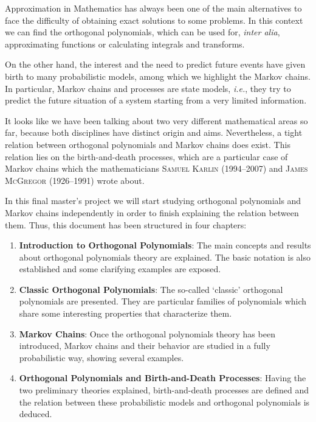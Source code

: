 
Approximation in Mathematics has always been one of the main alternatives to face the difficulty of obtaining exact solutions to some problems. In this context we can find the orthogonal polynomials, which can be used for, \textit{inter alia}, approximating functions or calculating integrals and transforms.

On the other hand, the interest and the need to predict future events have given birth to many probabilistic models, among which we highlight the Markov chains. In particular, Markov chains and processes are state models, \textit{i.e.}, they try to predict the future situation of a system starting from a very limited information.

It looks like we have been talking about two very different mathematical areas so far, because both disciplines have distinct origin and aims. Nevertheless, a tight relation between orthogonal polynomials and Markov chains does exist. This relation lies on the birth-and-death processes, which are a particular case of Markov chains which the mathematicians \textsc{Samuel Karlin} (1994--2007) and \textsc{James McGregor} (1926--1991) wrote about.

In this final master's project we will start studying orthogonal polynomials and Markov chains independently in order to finish explaining the relation between them. Thus, this document has been structured in four chapters: 

\begin{enumerate}
    \item \textbf{Introduction to Orthogonal Polynomials}: The main concepts and results about orthogonal polynomials theory are explained. The basic notation is also established and some clarifying examples are exposed.
    \item \textbf{Classic Orthogonal Polynomials}: The so-called `classic' orthogonal polynomials are presented. They are particular families of polynomials which share some interesting properties that characterize them.
    \item \textbf{Markov Chains}: Once the orthogonal polynomials theory has been introduced, Markov chains and their behavior are studied in a fully probabilistic way, showing several examples.
    \item \textbf{Orthogonal Polynomials and Birth-and-Death Processes}: Having the two preliminary theories explained, birth-and-death processes are defined and the relation between these probabilistic models and orthogonal polynomials is deduced.
\end{enumerate}


